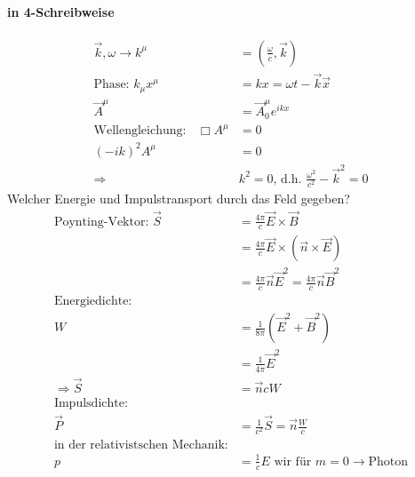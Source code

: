 \documentclass[a4paper]{article}
\newcommand*\dalembert{\mathop{}\!\mathbin\Box}
\begin{document}
\paragraph{in 4-Schreibweise}
\begin{align}
\vec{k},\omega \rightarrow k^\mu&=(\frac{\omega}{c},\vec{k})\\
\text{Phase: }k_\mu x^\mu&=kx=\omega t- \vec{k}\vec{x}\\
\vec{A}^\mu&=\vec{A}^\mu_0 e^{ikx}\\
\text{Wellengleichung: } \dalembert A^\mu&=0\\
(-ik)^2 A^\mu&=0 \\
\Rightarrow &k^2=0 \text{, d.h. } \frac{\omega^2}{c^2}-\vec{k}^2=0
\end{align}
Welcher Energie und Impulstransport durch das Feld gegeben?\\
\begin{align}
\text{Poynting-Vektor: }\vec{S}&=\frac{4\pi}{c}\vec{E}\times\vec{B}\\
&=\frac{4\pi}{c}\vec{E}\times\left( \vec{n}\times\vec{E}\right)\\
&=\frac{4\pi}{c}\vec{n}\vec{E}^2=\frac{4\pi}{c}\vec{n}\vec{B}^2\\
\text{Energiedichte: }&\\
W&=\frac{1}{8\pi}\left( \vec{E}^2+\vec{B}^2 \right)\\
&=\frac{1}{4\pi}\vec{E}^2\\
\Rightarrow \vec{S}&=\vec{n}cW\\
\text{Impulsdichte: }&\\
\vec{P}&=\frac{1}{c^2}\vec{S}=\vec{n}\frac{W}{c}\\
\text{in der relativistschen Mechanik:}&\\
p&=\frac{1}{c}E \text{ wir für }m=0 \rightarrow \text{Photon}
\end{align}
\end{document}
